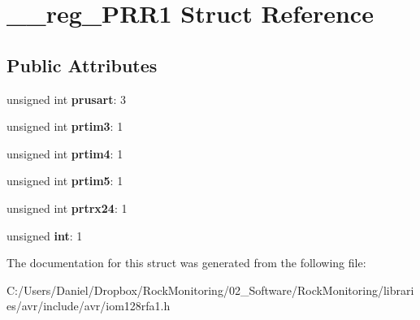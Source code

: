 \hypertarget{struct____reg___p_r_r1}{}\section{\+\_\+\+\_\+reg\+\_\+\+P\+R\+R1 Struct Reference}
\label{struct____reg___p_r_r1}
\subsection*{Public Attributes}
\begin{DoxyCompactItemize}
\item 
unsigned int {\bfseries prusart}\+: 3\hypertarget{struct____reg___p_r_r1_a60a10ca625c928507b0e9cb581f24b92}{}\label{struct____reg___p_r_r1_a60a10ca625c928507b0e9cb581f24b92}

\item 
unsigned int {\bfseries prtim3}\+: 1\hypertarget{struct____reg___p_r_r1_ae04ed44c5539eee4929b3e86cd91841f}{}\label{struct____reg___p_r_r1_ae04ed44c5539eee4929b3e86cd91841f}

\item 
unsigned int {\bfseries prtim4}\+: 1\hypertarget{struct____reg___p_r_r1_a97aa1030da00c830fee315881223e94e}{}\label{struct____reg___p_r_r1_a97aa1030da00c830fee315881223e94e}

\item 
unsigned int {\bfseries prtim5}\+: 1\hypertarget{struct____reg___p_r_r1_ab7a98b9e6716ae523bda3038a8ab245f}{}\label{struct____reg___p_r_r1_ab7a98b9e6716ae523bda3038a8ab245f}

\item 
unsigned int {\bfseries prtrx24}\+: 1\hypertarget{struct____reg___p_r_r1_afe41b8d9f9c6c8ba4803945e7e946297}{}\label{struct____reg___p_r_r1_afe41b8d9f9c6c8ba4803945e7e946297}

\item 
unsigned {\bfseries int}\+: 1\hypertarget{struct____reg___p_r_r1_aeaebe063b3cde00d561d03465d7dff0c}{}\label{struct____reg___p_r_r1_aeaebe063b3cde00d561d03465d7dff0c}

\end{DoxyCompactItemize}


The documentation for this struct was generated from the following file\+:\begin{DoxyCompactItemize}
\item 
C\+:/\+Users/\+Daniel/\+Dropbox/\+Rock\+Monitoring/02\+\_\+\+Software/\+Rock\+Monitoring/libraries/avr/include/avr/iom128rfa1.\+h\end{DoxyCompactItemize}
